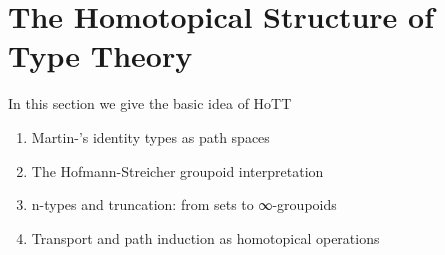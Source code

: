 \section{The Homotopical Structure of Type Theory}\label{sec:hott}

In this section we give the basic idea of HoTT 

\begin{enumerate}
    \item Martin-\Lof's identity types as path spaces
    \item The Hofmann-Streicher groupoid interpretation
    \item n-types and truncation: from sets to ∞-groupoids
    \item Transport and path induction as homotopical operations
\end{enumerate}